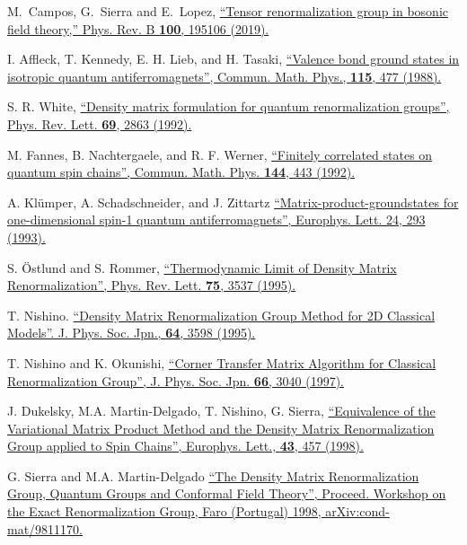 \documentclass[a4paper,preprintnumbers,nofootinbib,twocolumn]{quantumarticle}
\begin{document}
\begin{thebibliography}{99}


M.~Campos, G.~Sierra and E.~Lopez,
\href{https://doi.org/10.1103/PhysRevB.100.195106}{
``Tensor renormalization group in bosonic field theory,''
Phys. Rev. B \textbf{100}, 195106  (2019).
}

  I. Affleck, T. Kennedy, E. H. Lieb, and H. Tasaki,
\href{https://doi.org/10.1007/BF01218021}{
``Valence bond ground states in isotropic quantum antiferromagnets'',
Commun. Math. Phys., {\bf 115}, 477 (1988).
}

 S. R. White,
\href{https://doi.org/10.1103/PhysRevLett.69.2863}{
``Density matrix formulation for quantum renormalization groups'',
Phys. Rev. Lett. {\bf 69}, 2863 (1992).
}

  M. Fannes, B. Nachtergaele, and R. F. Werner,
\href{https://doi.org/10.1007/BF02099178}{
``Finitely correlated states on quantum spin chains'',
Commun. Math. Phys. {\bf 144}, 443 (1992).
}

  A. Kl\"{u}mper, A. Schadschneider, and J. Zittartz
\href{https://doi.org/10.1209/0295-5075/24/4/010}{
``Matrix-product-groundstates for one-dimensional spin-1 quantum antiferromagnets'',
Europhys. Lett. 24, 293 (1993).
}

 S. \"Ostlund and S.  Rommer,
\href{https://doi.org/10.1103/PhysRevLett.75.3537}{
``Thermodynamic Limit of Density Matrix Renormalization'',
Phys. Rev. Lett. {\bf 75}, 3537 (1995).
}

 T. Nishino.
\href{https://doi.org/10.1143/JPSJ.64.3598}{
``Density Matrix Renormalization Group Method for 2D Classical Models''.
J. Phys. Soc. Jpn., {\bf 64}, 3598 (1995).
}

T. Nishino and K. Okunishi,
\href{https://doi.org/10.1143/JPSJ.66.3040}{
``Corner Transfer Matrix Algorithm for Classical Renormalization Group'',
J. Phys. Soc. Jpn. {\bf 66}, 3040 (1997).
}

  J. Dukelsky, M.A. Martin-Delgado, T. Nishino, G. Sierra,
\href{https://doi.org/10.1209/epl/i1998-00381-x}{
``Equivalence of the Variational Matrix Product Method and the Density Matrix Renormalization Group applied to Spin Chains'',
Europhys. Lett., {\bf 43}, 457 (1998).
}

 G. Sierra and M.A. Martin-Delgado
\href{https://arxiv.org/abs/cond-mat/9811170}{
``The Density Matrix Renormalization Group, Quantum Groups and Conformal Field Theory'',
Proceed. Workshop on the Exact Renormalization Group, Faro (Portugal) 1998,
 arXiv:cond-mat/9811170.
}


\end{thebibliography}
\end{document}
